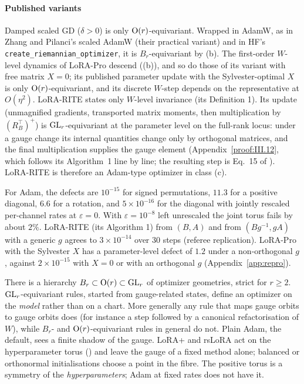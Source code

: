 \paragraph{Published variants} Damped scaled GD ($\delta>0$) is only $\mathrm{O}(r)$-equivariant. Wrapped in AdamW, as in
Zhang and Pilanci's scaled AdamW (their practical variant) and in HF's \texttt{create\_\allowbreak riemannian\_\allowbreak optimizer}, it is
$B_r$-equivariant by (b). The first-order $W$-level dynamics of LoRA-Pro \citep{wang2024lorac} descend
((b)), and so do those of its variant with free matrix $X=0$; its published parameter update
with the Sylvester-optimal $X$ is only $\mathrm{O}(r)$-equivariant, and its discrete $W$-step depends on the representative at
$O(\eta^2)$. LoRA-RITE states only $W$-level invariance (its Definition 1). Its update (unmagnified gradients,
transported matrix moments, then multiplication by $(R_B^\top)^+$) is $\mathrm{GL}_r$-equivariant at the parameter level on the
full-rank locus: under a gauge change its internal quantities change only by orthogonal matrices, and the final
multiplication supplies the gauge element (Appendix~\ref{proof:III.12}, which follows its Algorithm~1 line by line; the
resulting step is Eq.~15 of \citet{yen2024lora}). LoRA-RITE is therefore an Adam-type optimizer in class (c).

\noindent{}\enspace For Adam, the defects are $10^{-15}$ for signed permutations, $11.3$ for a positive
diagonal, $6.6$ for a rotation, and $5\times10^{-16}$ for the diagonal with jointly rescaled per-channel rates at
$\varepsilon=0$. With $\varepsilon=10^{-8}$ left unrescaled the joint torus fails by about $2\%$. LoRA-RITE (its
Algorithm 1) from $(B,A)$ and from $(Bg^{-1},gA)$ with a generic $g$ agrees to $3\times10^{-14}$ over 30 steps
(referee replication). LoRA-Pro with the Sylvester $X$ has a parameter-level defect of $1.2$ under a non-orthogonal $g$,
against $2\times10^{-15}$ with $X=0$ or with an orthogonal $g$ (Appendix~\ref{app:repro}).

\begin{explains}
There is a hierarchy $B_r\subset\mathrm{O}(r)\subset\mathrm{GL}_r$ of optimizer geometries, strict for $r\ge2$. $\mathrm{GL}_r$-equivariant
rules, started from gauge-related states, define an optimizer on the \emph{model} rather than on a chart. More generally
any rule that maps gauge orbits to gauge orbits does (for instance a step followed by a canonical refactorisation of
$W$), while $B_r$- and $\mathrm{O}(r)$-equivariant rules in general do not. Plain Adam, the default, sees a finite shadow of
the gauge. LoRA+ and rsLoRA act on the hyperparameter torus () and leave the gauge of a fixed
method alone; balanced or orthonormal initialisations choose a point in the fibre. The positive torus is a symmetry of
the \emph{hyperparameters}; Adam at fixed rates does not have it.
\end{explains}

